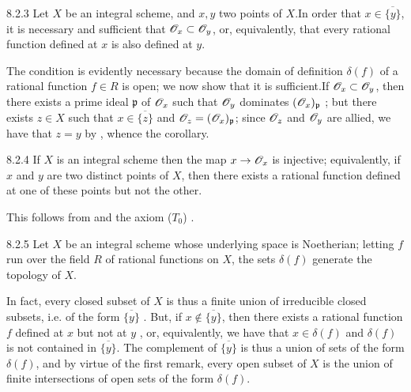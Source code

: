 \begin{envs}[Corollary]{8.2.3}
\label{cor-1.8.2.3}
Let $X$ be an integral scheme, and $x,y$ two
points of $X$.In order that $x\in\overline{\{y\}}$, it is necessary and
sufficient that $\mathscr{O}_x\subset\mathscr{O}_y$, or, equivalently, that every rational
function defined at $x$ is also defined at $y$.
\end{envs}

The condition is evidently necessary because the domain of definition
$\delta(f)$ of a rational function $f\in R$ is open; we now show that it is
sufficient.If $\mathscr{O}_x\subset\mathscr{O}_y$, then there exists a prime ideal
$\mathfrak{p}$ of $\mathscr{O}_x$ such that $\mathscr{O}_y$ dominates $(\mathscr{O}_x)_\mathfrak{p}$
; but  there exists $z\in X$ such that
$x\in\overline{\{z\}}$ and $\mathscr{O}_z=(\mathscr{O}_x)_\mathfrak{p}$; since $\mathscr{O}_z$ and $\mathscr{O}_y$
are allied, we have that $z=y$ by , whence the corollary.

\begin{envs}[Corollary]{8.2.4}
\label{cor-1.8.2.4}
If $X$ is an integral scheme then the map
$x\to\mathscr{O}_x$ is injective; equivalently, if $x$ and $y$ are two distinct points of
$X$, then there exists a rational function defined at one of these points but
not the other.
\end{envs}

This follows from  and the axiom ($T_0$) .

\begin{envs}[Corollary]{8.2.5}
\label{cor-1.8.2.5}
Let $X$ be an integral scheme whose underlying
space is Noetherian; letting $f$ run over the field $R$ of rational functions on
$X$, the sets $\delta(f)$ generate the topology of $X$.
\end{envs}

In fact, every closed subset of $X$ is thus a finite union of irreducible closed
subsets, i.e. of the form $\overline{\{y\}}$ . But, if
$x\not\in\overline{\{y\}}$, then there exists a rational function $f$ defined at
$x$ but not at $y$ , or, equivalently, we have that $x\in\delta(f)$
and $\delta(f)$ is not contained in $\overline{\{y\}}$. The complement of
$\overline{\{y\}}$ is thus a union of sets of the form $\delta(f)$, and by
virtue of the first remark, every open subset of $X$ is the union of finite
intersections of open sets of the form $\delta(f)$.

